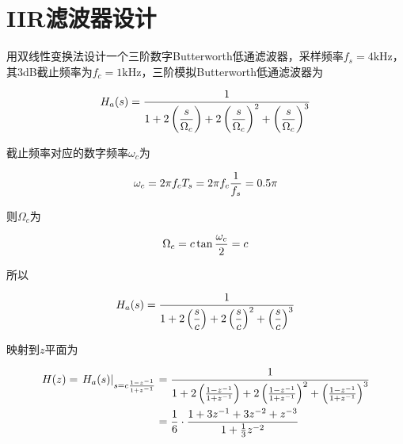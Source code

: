 \documentclass[cn, hazy, blue, normal, 14pt]{elegantnote}
\begin{document}
\section{IIR滤波器设计}

\begin{exercise}

用双线性变换法设计一个三阶数字Butterworth低通滤波器，采样频率$f_s=4\text{kHz}$，其3dB截止频率为$f_c=1\text{kHz}$，三阶模拟Butterworth低通滤波器为

\begin{equation}
\notag
    H_a(s)=\dfrac{1}{1+2\left(\dfrac{s}{\Omega_c}\right)+2\left(\dfrac{s}{\Omega_c}\right)^2+\left(\dfrac{s}{\Omega_c}\right)^3}
\end{equation}

\end{exercise}

\begin{solution}[print=true]

截止频率对应的数字频率$\omega_c$为

\begin{equation}
\notag
    \omega_c=2\pi  f_c T_s=2\pi f_c\dfrac{1}{f_s}=0.5\pi
\end{equation}

则$\Omega_c$为

\begin{equation}
\notag
    \Omega_c=c\tan\dfrac{\omega_c}{2}=c
\end{equation}

所以

\begin{equation}
\notag
    H_a(s)=\dfrac{1}{1+2\left(\dfrac{s}{c}\right)+2\left(\dfrac{s}{c}\right)^2+\left(\dfrac{s}{c}\right)^3}
\end{equation}

映射到$z$平面为

\begin{equation}
\notag
\begin{aligned}
    H(z)=\left.H_a(s)\right|_{s=c\frac{1-z^{-1}}{1+z^{-1}}}&=\dfrac{1}{1+2\left(\frac{1-z^{-1}}{1+z^{-1}}\right)+2\left(\frac{1-z^{-1}}{1+z^{-1}}\right)^2+\left(\frac{1-z^{-1}}{1+z^{-1}}\right)^3} \\
    &=\frac{1}{6}\cdot\frac{1+3z^{-1}+3z^{-2}+z^{-3}}{1+\frac{1}{3}z^{-2}}
\end{aligned}
\end{equation}

\end{solution}
\end{document}
